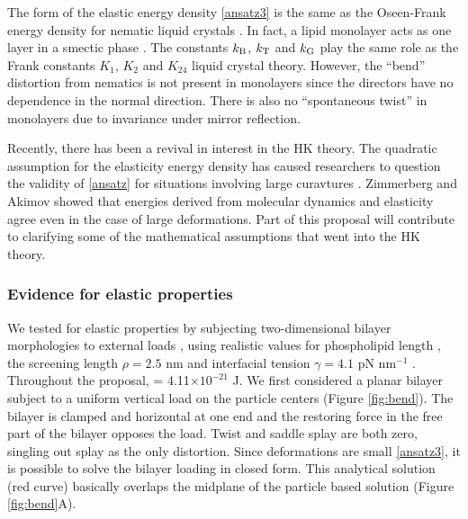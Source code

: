 The form of the elastic energy density \eqref{ansatz3} is the same as
the Oseen-Frank energy density for nematic liquid crystals \cite{ANDRIENKO2018520,Tran7106}.  In fact,  
a lipid monolayer acts as one layer in a smectic  phase \cite{REYESMATEO1995978,Rangamani20140463,PhysRevLett.113.248102}. 
The constants $k_{\mathrm{B}}$, $k_{\mathrm{T}}$  and $k_{\mathrm{G}}$ play the same role as the Frank constants $K_1$, $K_2$ and $K_{24}$
liquid crystal theory. However, the ``bend'' distortion from nematics  
is not present in monolayers since the directors have no dependence in the normal direction.
There is also no ``spontaneous twist'' in monolayers due to invariance under mirror reflection. 

Recently, there has been a revival in interest in the HK theory. The quadratic assumption
for the elasticity energy density has caused researchers to question the validity of \eqref{ansatz}
for situations involving large curavtures \cite{PRL}. Zimmerberg and Akimov \cite{https://doi.org/10.1039/C9SM02079A}
showed that energies derived from molecular dynamics and elasticity agree even in the case of large deformations.
Part of this proposal will contribute to clarifying some of the mathematical
assumptions that went into the HK theory. 


\subsubsection{Evidence for elastic properties}
\label{sssec:evidence}
We tested for elastic properties by subjecting two-dimensional bilayer morphologies
to external loads \cite{Fu19}, using realistic
values for phospholipid length \cite{Boal},
the screening length $\rho = 2.5$ nm \cite{Eriksson1989,Lin2005,Parsegian,Israelachvili80,TerziDeserno17}
and  interfacial tension $\gamma=4.1$ pN nm$^{-1}$  \cite{GarciaSaez, KUZMIN2005, Petelska2012}.
Throughout the proposal, \kBT\; = 4.11$\times 10^{-21}$ J.
We first considered a planar bilayer subject to a uniform vertical load on the particle centers (Figure \ref{fig:bend}). 
The bilayer is clamped and horizontal at one end and the restoring force in the free part 
of the bilayer opposes the load. Twist and saddle splay are both zero, singling out splay
as the only distortion.
Since deformations are small \eqref{ansatz3}, it is possible to solve the bilayer loading in closed form. 
This analytical solution (red curve) basically overlaps the midplane of the particle based solution (Figure \ref{fig:bend}A). 

